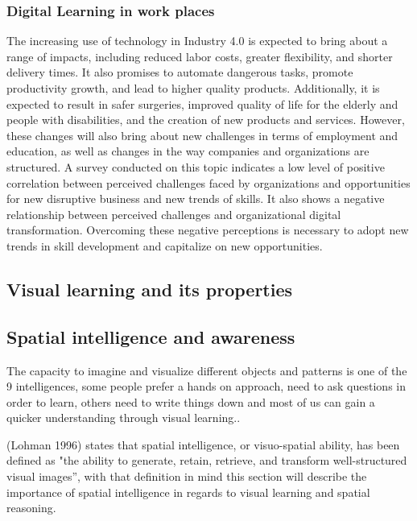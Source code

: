 \subsubsection*{Digital Learning in work places}

The increasing use of technology in Industry 4.0 is expected to bring about a range of impacts, including reduced labor costs, greater flexibility, and shorter delivery times. It also promises to automate dangerous tasks, promote productivity growth, and lead to higher quality products.
Additionally, it is expected to result in safer surgeries, improved quality of life for the elderly and people with disabilities, and the creation of new products and services. However, these changes will also bring about new challenges in terms of employment and education, as well as changes in the way companies and organizations are structured.
A survey conducted on this topic indicates a low level of positive correlation between perceived challenges faced by organizations and opportunities for new disruptive business and new trends of skills.
It also shows a negative relationship between perceived challenges and organizational digital transformation. Overcoming these negative perceptions is necessary to adopt new trends in skill development and capitalize on new opportunities.\cite*{Skills_Digital_Learning}

\subsection{Visual learning and its properties}\label{ch:visual_learning_and_its_properties}
\subsection{Spatial intelligence and awareness}\label{ch:spatial_intelligence_and_awareness}
The capacity to imagine and visualize different objects and patterns is one of the 9 intelligences, some people prefer a hands on approach, need to ask questions in order to learn, others need to write things down and most of us can gain a quicker understanding through visual learning.\cite*{pracpsych2022}.


(Lohman 1996) states that spatial intelligence, or visuo-spatial ability, has been defined as "the ability to generate, retain, retrieve, and transform well-structured visual images”\cite[p97]{tapsfield1996}, with that definition in mind this section will describe the importance of spatial intelligence in regards to visual learning and spatial reasoning.

